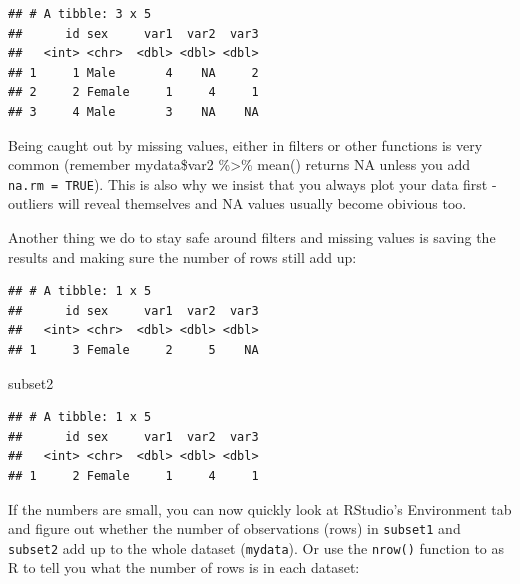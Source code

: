 \documentclass[12pt,]{krantz}
\makeatletter
\newenvironment{Shaded}{\begin{snugshade}}{\end{snugshade}}
\newcommand{\DecValTok}[1]{\textcolor[rgb]{0.00,0.00,0.81}{#1}}
\newcommand{\KeywordTok}[1]{\textcolor[rgb]{0.13,0.29,0.53}{\textbf{#1}}}
\newcommand{\NormalTok}[1]{#1}
\newcommand{\OperatorTok}[1]{\textcolor[rgb]{0.81,0.36,0.00}{\textbf{#1}}}
\newcommand{\StringTok}[1]{\textcolor[rgb]{0.31,0.60,0.02}{#1}}
\newenvironment{kframe}{%
\medskip{}
\setlength{\fboxsep}{.8em}
 \def\at@end@of@kframe{}%
 \ifinner\ifhmode%
  \def\at@end@of@kframe{\end{minipage}}%
  \begin{minipage}{\columnwidth}%
 \fi\fi%
 \def\FrameCommand##1{\hskip\@totalleftmargin \hskip-\fboxsep
 \colorbox{shadecolor}{##1}\hskip-\fboxsep
     \hskip-\linewidth \hskip-\@totalleftmargin \hskip\columnwidth}%
 \MakeFramed {\advance\hsize-\width
   \@totalleftmargin\z@ \linewidth\hsize
   \@setminipage}}%
 {\par\unskip\endMakeFramed%
 \at@end@of@kframe}
\renewenvironment{Shaded}{\begin{kframe}}{\end{kframe}}
\theoremstyle{definition}
\theoremstyle{definition}
\theoremstyle{definition}
\theoremstyle{remark}
\makeatother
\begin{document}
\begin{verbatim}
## # A tibble: 3 x 5
##      id sex     var1  var2  var3
##   <int> <chr>  <dbl> <dbl> <dbl>
## 1     1 Male       4    NA     2
## 2     2 Female     1     4     1
## 3     4 Male       3    NA    NA
\end{verbatim}

Being caught out by missing values, either in filters or other functions
is very common (remember mydata\$var2 \%\textgreater{}\% mean() returns
NA unless you add \texttt{na.rm\ =\ TRUE}). This is also why we insist
that you always plot your data first - outliers will reveal themselves
and NA values usually become obivious too.

Another thing we do to stay safe around filters and missing values is
saving the results and making sure the number of rows still add up:

\begin{Shaded}
\end{Shaded}

\begin{verbatim}
## # A tibble: 1 x 5
##      id sex     var1  var2  var3
##   <int> <chr>  <dbl> <dbl> <dbl>
## 1     3 Female     2     5    NA
\end{verbatim}

\begin{Shaded}
\begin{Highlighting}[]
\NormalTok{subset2}
\end{Highlighting}
\end{Shaded}

\begin{verbatim}
## # A tibble: 1 x 5
##      id sex     var1  var2  var3
##   <int> <chr>  <dbl> <dbl> <dbl>
## 1     2 Female     1     4     1
\end{verbatim}

If the numbers are small, you can now quickly look at RStudio's
Environment tab and figure out whether the number of observations (rows)
in \texttt{subset1} and \texttt{subset2} add up to the whole dataset
(\texttt{mydata}). Or use the \texttt{nrow()} function to as R to tell
you what the number of rows is in each dataset:
\end{document}
